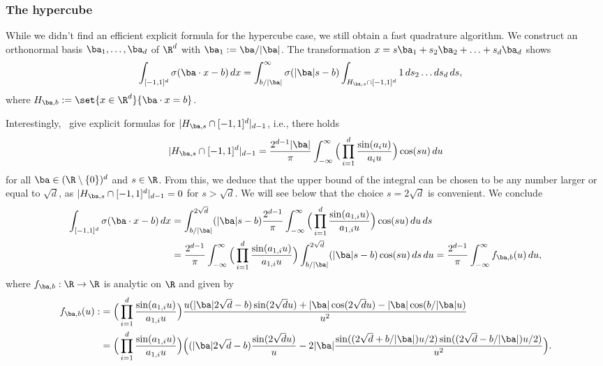 \documentclass{amsart}[11pt]
\numberwithin{equation}{section}
\numberwithin{theorem}{section}
\begin{document}
\subsubsection{The hypercube}
While we didn't find an efficient explicit formula for the hypercube case, we still obtain a fast quadrature algorithm. We construct an orthonormal basis $\ba_1,\ldots,\ba_d$ of $\R^d$ with $\ba_1:=\ba/|\ba|$.
The transformation $x= s\ba_1  + s_2\ba_2+\ldots+s_d\ba_d$ shows
\begin{align*}
\int_{[-1,1]^d} \sigma(\ba\cdot x - b)\,dx &=
\int_{b/|\ba|}^{\infty}\sigma(|\ba|s - b) \int_{H_{\ba,s}\cap [-1,1]^d}1\,ds_2\ldots ds_d \,ds,
\end{align*}
where $H_{\ba,b}:= \set{x\in\R^d}{\ba\cdot x = b}$. 

Interestingly,~\cite{intersections,intersections2} give explicit formulas for $|H_{\ba,s}\cap [-1,1]^d|_{d-1}$, i.e., there holds 
\begin{align*}
|H_{\ba,s}\cap [-1,1]^d|_{d-1} = \frac{2^{d-1}|\ba|}{\pi}\int_{-\infty}^\infty \Big( \prod_{i=1}^d \frac{\sin(a_{i} u)}{a_{i}u}\Big) \cos(su)\,du
\end{align*}
for all $\ba \in (\R \setminus \{0\})^d$ and $s\in\R$. From this, we deduce that the upper bound of the integral can be chosen to be any number larger or equal to $\sqrt{d}$, as $|H_{\ba,s}\cap [-1,1]^d|_{d-1}=0$ for $s>\sqrt{d}$. We will see below that the choice $s=2\sqrt{d}$ is convenient.
We conclude
\begin{align*}
\int_{[-1,1]^d} \sigma(\ba\cdot x - b)\,dx &=
\int_{b/|\ba|}^{2\sqrt{d}} (|\ba|s - b)
\frac{2^{d-1}}{\pi}\int_{-\infty}^\infty \Big( \prod_{i=1}^d \frac{\sin(a_{1,i} u)}{a_{1,i} u}\Big) \cos(su)\,du\,ds\\
&=
\frac{2^{d-1}}{\pi}\int_{-\infty}^\infty
 \Big( \prod_{i=1}^d \frac{\sin(a_{1,i} u)}{a_{1,i} u}\Big) \int_{b/|\ba|}^{2\sqrt{d}} (|\ba|s - b)\cos(su)\,ds\,du=
\frac{2^{d-1}}{\pi}\int_{-\infty}^\infty
  f_{\ba, b}(u) \,du,
\end{align*}
where $f_{\ba, b}: \R \to \R$ is analytic on $\R$ and given by
\begin{align*}
    f_{\ba, b}(u) :&= \Big( \prod_{i=1}^d \frac{\sin(a_{1,i} u)}{a_{1,i} u}\Big)\frac{u(|\ba|2\sqrt{d}-b)\sin(2\sqrt{d}u)+|\ba|\cos(2\sqrt{d}u)-|\ba|\cos(b/|\ba|u)}{u^2} \\
    &= \Big( \prod_{i=1}^d \frac{\sin(a_{1,i} u)}{a_{1,i} u}\Big)\Big((|\ba|2\sqrt{d}-b) \frac{\sin(2\sqrt{d}u)}{u} - 2|\ba|\frac{\sin((2\sqrt{d}+b/|\ba|)u/2)\sin((2\sqrt{d}-b/|\ba|)u/2)}{u^2}\Big).
\end{align*}
\end{document}
